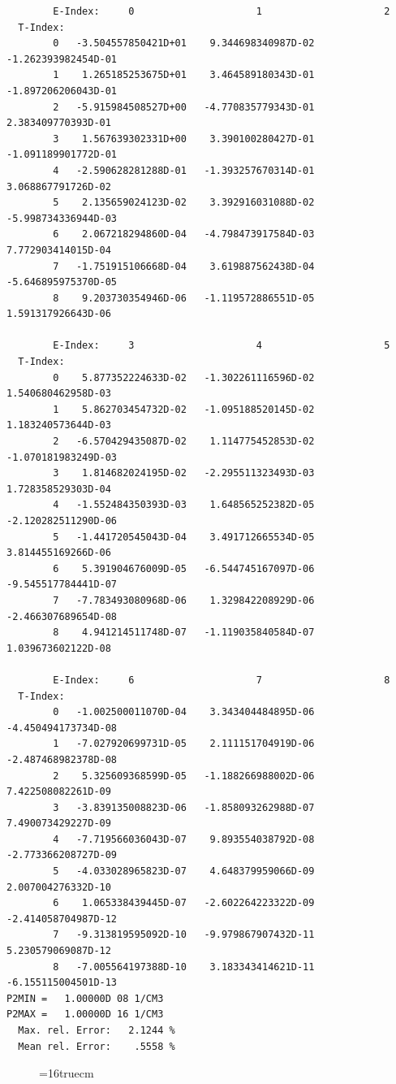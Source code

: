 \documentclass[12pt,dvipdfmx]{article}
\begin{document}
\begin{small}\begin{verbatim}
        E-Index:     0                     1                     2
  T-Index:
        0   -3.504557850421D+01    9.344698340987D-02   -1.262393982454D-01
        1    1.265185253675D+01    3.464589180343D-01   -1.897206206043D-01
        2   -5.915984508527D+00   -4.770835779343D-01    2.383409770393D-01
        3    1.567639302331D+00    3.390100280427D-01   -1.091189901772D-01
        4   -2.590628281288D-01   -1.393257670314D-01    3.068867791726D-02
        5    2.135659024123D-02    3.392916031088D-02   -5.998734336944D-03
        6    2.067218294860D-04   -4.798473917584D-03    7.772903414015D-04
        7   -1.751915106668D-04    3.619887562438D-04   -5.646895975370D-05
        8    9.203730354946D-06   -1.119572886551D-05    1.591317926643D-06

        E-Index:     3                     4                     5
  T-Index:
        0    5.877352224633D-02   -1.302261116596D-02    1.540680462958D-03
        1    5.862703454732D-02   -1.095188520145D-02    1.183240573644D-03
        2   -6.570429435087D-02    1.114775452853D-02   -1.070181983249D-03
        3    1.814682024195D-02   -2.295511323493D-03    1.728358529303D-04
        4   -1.552484350393D-03    1.648565252382D-05   -2.120282511290D-06
        5   -1.441720545043D-04    3.491712665534D-05    3.814455169266D-06
        6    5.391904676009D-05   -6.544745167097D-06   -9.545517784441D-07
        7   -7.783493080968D-06    1.329842208929D-06   -2.466307689654D-08
        8    4.941214511748D-07   -1.119035840584D-07    1.039673602122D-08

        E-Index:     6                     7                     8
  T-Index:
        0   -1.002500011070D-04    3.343404484895D-06   -4.450494173734D-08
        1   -7.027920699731D-05    2.111151704919D-06   -2.487468982378D-08
        2    5.325609368599D-05   -1.188266988002D-06    7.422508082261D-09
        3   -3.839135008823D-06   -1.858093262988D-07    7.490073429227D-09
        4   -7.719566036043D-07    9.893554038792D-08   -2.773366208727D-09
        5   -4.033028965823D-07    4.648379959066D-09    2.007004276332D-10
        6    1.065338439445D-07   -2.602264223322D-09   -2.414058704987D-12
        7   -9.313819595092D-10   -9.979867907432D-11    5.230579069087D-12
        8   -7.005564197388D-10    3.183343414621D-11   -6.155115004501D-13
P2MIN =   1.00000D 08 1/CM3
P2MAX =   1.00000D 16 1/CM3
  Max. rel. Error:   2.1244 %
  Mean rel. Error:    .5558 %

\end{verbatim}\end{small}
\begin{figure} \label{2.2.5fl}
\epsfxsize=16truecm
\end{figure}
\newpage
\end{document}
